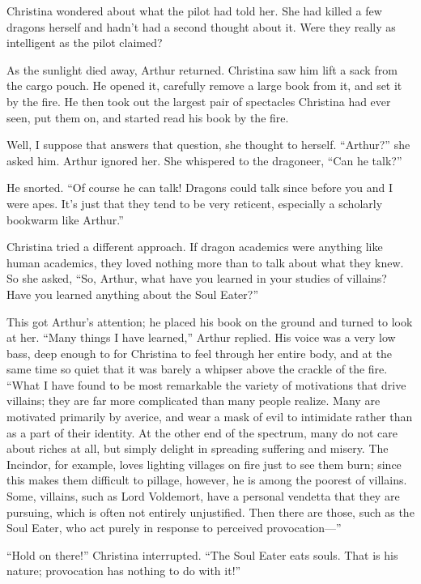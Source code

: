 \documentclass[showtrims,b6paper,draft,10pt]{memoir}
\begin{document}
Christina wondered about what the pilot had told her.  She had killed a few dragons herself and hadn't had a second thought about it.  Were they really as intelligent as the pilot claimed?

As the sunlight died away, Arthur returned.  Christina saw him lift a sack from the cargo pouch.  He opened it, carefully remove a large book from it, and set it by the fire.  He then took out the largest pair of spectacles Christina had ever seen, put them on, and started read his book by the fire.

Well, I suppose that answers that question, she thought to herself.  ``Arthur?'' she asked him.  Arthur ignored her.  She whispered to the dragoneer, ``Can he talk?''

He snorted.  ``Of course he can talk!  Dragons could talk since before you and I were apes.  It's just that they tend to be very reticent, especially a scholarly bookwarm like Arthur.''

Christina tried a different approach.  If dragon academics were anything like human academics, they loved nothing more than to talk about what they knew.  So she asked, ``So, Arthur, what have you learned in your studies of villains?  Have you learned anything about the Soul Eater?''

This got Arthur's attention;  he placed his book on the ground and turned to look at her.  ``Many things I have learned,'' Arthur replied.  His voice was a very low bass, deep enough to for Christina to feel through her entire body, and at the same time so quiet that it was barely a whipser above the crackle of the fire.  ``What I have found to be most remarkable the variety of motivations that drive villains;  they are far more complicated than many people realize.  Many are motivated primarily by averice, and wear a mask of evil to intimidate rather than as a part of their identity.  At the other end of the spectrum, many do not care about riches at all, but simply delight in spreading suffering and misery.  The Incindor, for example, loves lighting villages on fire just to see them burn;  since this makes them difficult to pillage, however, he is among the poorest of villains.  Some, villains, such as Lord Voldemort, have a personal vendetta that they are pursuing, which is often not entirely unjustified.  Then there are those, such as the Soul Eater, who act purely in response to perceived provocation---''

``Hold on there!'' Christina interrupted.  ``The Soul Eater eats souls.  That is his nature;  provocation has nothing to do with it!''
\end{document}
